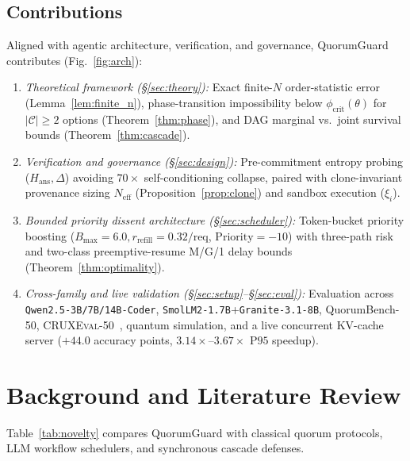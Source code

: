 \documentclass[conference]{IEEEtran}
\def\QG{QuorumGuard}%
\def\QBench{QuorumBench-50}%
\theoremstyle{definition}
\theoremstyle{remark}
\newcommand{\QG}{\textsc{QuorumGuard}}
\newcommand{\QBench}{\textsc{QuorumBench-50}}
\newcommand{\Neff}{N_{\mathrm{eff}}}
\newcommand{\Hans}{H_{\mathrm{ans}}}
\newcommand{\phicrit}{\phi_{\mathrm{crit}}}
\begin{document}
\subsection{Contributions}
Aligned with agentic architecture, verification, and governance, \QG{} contributes (Fig.~\ref{fig:arch}):
\begin{enumerate}
  \item \emph{Theoretical framework (\S\ref{sec:theory}):} Exact finite-$N$ order-statistic error (Lemma~\ref{lem:finite_n}), phase-transition impossibility below $\phicrit(\theta)$ for $|\mathcal{C}| \ge 2$ options (Theorem~\ref{thm:phase}), and DAG marginal vs.\ joint survival bounds (Theorem~\ref{thm:cascade}).
  \item \emph{Verification and governance (\S\ref{sec:design}):} Pre-commitment entropy probing ($\Hans, \Delta$) avoiding $70\times$ self-conditioning collapse, paired with clone-invariant provenance sizing $\Neff$ (Proposition~\ref{prop:clone}) and sandbox execution ($\xi_i$).
  \item \emph{Bounded priority dissent architecture (\S\ref{sec:scheduler}):} Token-bucket priority boosting ($B_{\max}=6.0, r_{\mathrm{refill}}=0.32/\text{req}$, $\mathrm{Priority} = -10$) with three-path risk and two-class preemptive-resume M/G/1 delay bounds (Theorem~\ref{thm:optimality}).
  \item \emph{Cross-family and live validation (\S\ref{sec:setup}--\S\ref{sec:eval}):} Evaluation across \texttt{Qwen2.5-3B/7B/14B-Coder}, \texttt{SmolLM2-1.7B}+\texttt{Granite-3.1-8B}, \QBench{}, \textsc{CRUXEval-50}~\cite{gu2024cruxeval}, quantum simulation, and a live concurrent KV-cache server ($+44.0$ accuracy points, $3.14\times$--$3.67\times$ $\mathrm{P95}$ speedup).
\end{enumerate}

\section{Background and Literature Review}\label{sec:related}

Table~\ref{tab:novelty} compares \QG{} with classical quorum protocols, LLM workflow schedulers, and synchronous cascade defenses.
\end{document}
